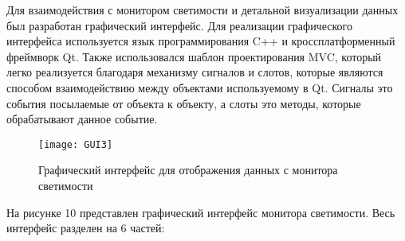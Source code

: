   Для взаимодействия с монитором светимости и детальной визуализации данных был разработан графический интерфейс. Для реализации графического интерфейса используется язык программирования C++ и кроссплатформенный фреймворк Qt. Также использовался шаблон проектирования MVC, который легко реализуется благодаря механизму сигналов и слотов, которые являются способом взаимодействию между объектами используемому в Qt. Сигналы это события посылаемые от объекта к объекту, а слоты это методы, которые обрабатывают данное событие.\par
\begin{figure}[htp]
  \centering
  \texttt{[image: GUI3]}
  \caption{Графический интерфейс для отображения данных с монитора светимости}
  \label{fig:galaxy}
\end{figure}
  На рисунке 10 представлен графический интерфейс монитора светимости. Весь интерфейс разделен на 6 частей:
